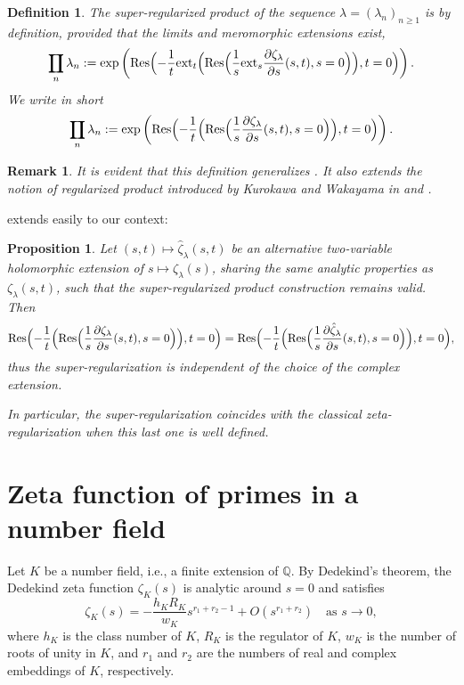 \documentclass[12pt]{amsart}
\DeclareMathOperator*\Rprod{%
\mathchoice
  {\ooalign{$\displaystyle\prod$\cr\hidewidth$\displaystyle\coprod$\hidewidth\cr}}%
  {\ooalign{$\textstyle\prod$\cr\hidewidth$\textstyle\coprod$\hidewidth\cr}}%
  {\ooalign{$\scriptstyle\prod$\cr\hidewidth$\scriptstyle\coprod$\hidewidth\cr}}%
  {\ooalign{$\scriptscriptstyle\prod$\cr\hidewidth$%
  \scriptscriptstyle\coprod$\hidewidth\cr}}}
\newtheorem{proposition}[theorem]{Proposition}
\newtheorem{definition}[theorem]{Definition}%
\newtheorem{remark}[theorem]{Remark}
\newcommand{\pt}{\partial}
\begin{document}
\begin{definition}
The {super-regularized product} of the sequence $\lambda = (\lambda_n)_{n \geq 1}$ is by definition, provided that the limits and meromorphic extensions exist,
\[
\Rprod_{n} \lambda_n:=\exp\left(
\mathrm{Res}\Bigl({-} \frac{1}{t}\mathrm{ext}_t\Bigl(\mathrm{Res}\Bigl(\frac{1}{s} \mathrm{ext}_s\frac{\pt \zeta_\lambda}
{\pt s}(s,t) ,s=0   \Bigr) \Bigr),t=0\Bigr)\right).
\]
We write in short
\[
\Rprod_{n} \lambda_n:=\exp\left(
\mathrm{Res}\Bigl({-} \frac{1}{t}\Bigl(\mathrm{Res}\Bigl(\frac{1}{s} \frac{\pt \zeta_\lambda}
{\pt s}(s,t) ,s=0   \Bigr) \Bigr),t=0\Bigr)\right).
\]



\end{definition}

\begin{remark}
It is evident that this definition generalizes \cite[Definition~1]{Marco_prime}. It also extends the notion of regularized product introduced by Kurokawa and Wakayama in \cite{Kurokawa-2005} and \cite{Kurokawa-2004}.
\end{remark}



\cite[Proposition 2]{Marco_prime} extends easily to our context:
\begin{proposition}
Let $(s, t) \mapsto \hat{\zeta}_\lambda(s, t)$ be an alternative two-variable holomorphic extension of $s \mapsto \zeta_\lambda(s)$, sharing the same analytic properties as $\zeta_\lambda(s,t)$, such that the super-regularized product construction remains valid. Then
\[
\mathrm{Res}\Bigl({-} \frac{1}{t}\Bigl(\mathrm{Res}\Bigl(\frac{1}{s} \frac{\pt \zeta_\lambda}
{\pt s}(s,t) ,s=0   \Bigr) \Bigr),t=0\Bigr)=
\mathrm{Res}\Bigl({-} \frac{1}{t}\Bigl(\mathrm{Res}\Bigl(\frac{1}{s} \frac{\pt \hat{\zeta}_\lambda}
{\pt s}(s,t) ,s=0   \Bigr) \Bigr),t=0\Bigr),
\]
thus the super-regularization is independent of the choice of the complex extension.


In particular, the super-regularization coincides with the classical zeta-regularization when this last one is well defined.
\end{proposition}




\section{Zeta function of primes in a number field}\label{ZPNF}


Let $K$ be a number field, i.e., a finite extension of $\mathbb{Q}$. By Dedekind's theorem, the Dedekind zeta function $\zeta_K(s)$ is analytic around $s=0$ and  satisfies
\[
\zeta_K(s) = -\frac{h_K R_K}{w_K} s^{r_1 + r_2 - 1} + O(s^{r_1 + r_2}) \quad \text{as } s \to 0,
\]
where $h_K$ is the class number of $K$, $R_K$ is the regulator of $K$, $w_K$ is the number of roots of unity in $K$,
and $r_1$ and $r_2$ are the numbers of real and complex embeddings of $K$, respectively.  
\end{document}
